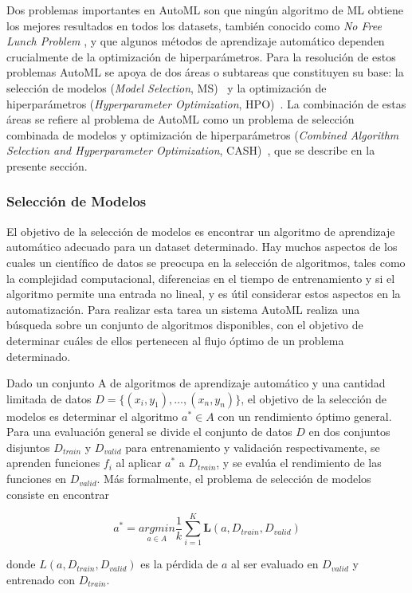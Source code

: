Dos problemas importantes en AutoML son que ningún algoritmo de ML obtiene los mejores resultados en todos los datasets, también conocido como \textit{No Free Lunch Problem} \cite{wolpert1995no}, y que algunos métodos de aprendizaje automático dependen crucialmente de la optimización de hiperparámetros. Para la resolución de estos problemas AutoML se apoya de dos áreas o subtareas que constituyen su base: la selección de modelos (\textit{Model Selection}, MS)~\cite{thornton2013auto} y la optimización de hiperparámetros (\textit{Hyperparameter Optimization}, HPO)~\cite{fuerer2019hyperparameter}. La combinación de estas áreas se refiere al problema de AutoML como un problema de selección combinada de modelos y optimización de hiperparámetros (\textit{Combined Algorithm Selection and Hyperparameter Optimization}, CASH)~\cite{thornton2013auto}, que se describe en la presente sección.

\subsubsection{Selección de Modelos}

El objetivo de la selección de modelos es encontrar un algoritmo de aprendizaje automático adecuado para un dataset determinado. Hay muchos aspectos de los cuales un científico de datos se preocupa en la selección de algoritmos, tales como la complejidad computacional, diferencias en el tiempo de entrenamiento y si el algoritmo permite una entrada no lineal, y es útil considerar estos aspectos en la automatización. Para realizar esta tarea un sistema AutoML realiza una búsqueda sobre un conjunto de algoritmos disponibles, con el objetivo de determinar cuáles de ellos pertenecen al flujo óptimo de un problema determinado.

\begin{definition}
	Dado un conjunto A de algoritmos de aprendizaje automático y una cantidad limitada de datos $D = \{(x_i, y_1),..., (x_n, y_n)\}$, el objetivo de la selección de modelos es determinar el algoritmo $a^* \in A$ con un rendimiento óptimo general. Para una evaluación general se divide el conjunto de datos $D$ en dos conjuntos disjuntos $D_{train}$ y $D_{valid}$ para entrenamiento y validación respectivamente, se aprenden funciones $f_i$ al aplicar $a^*$ a $D_{train}$, y se evalúa el rendimiento de las funciones en $D_{valid}$. Más formalmente, el problema de selección de modelos consiste en encontrar

	\begin{equation}
		a^* = \underset{a \in A}{argmin} \dfrac{1}{k}\sum_{i=1}^K \textbf{L}(a, D_{train}, D_{valid})
	\end{equation}
	
	donde $L(a, D_{train}, D_{valid})$ es la pérdida de $a$ al ser evaluado en $D_{valid}$ y entrenado con $D_{train}$.
	

\end{definition}

